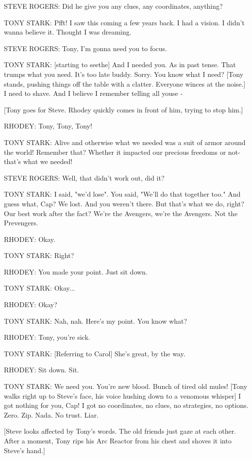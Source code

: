 STEVE ROGERS: Did he give you any clues, any coordinates, anything?

TONY STARK: Pfft! I saw this coming a few years back. I had a vision. I didn't wanna believe it. Thought I was dreaming.

STEVE ROGERS: Tony, I'm gonna need you to focus.

TONY STARK: [starting to seethe] And I needed you. As in past tense. That trumps what you need. It's too late buddy. Sorry. You know what I need? [Tony stands, pushing things off the table with a clatter. Everyone winces at the noise.] I need to shave. And I believe I remember telling all youse -

[Tony goes for Steve. Rhodey quickly comes in front of him, trying to stop him.]

RHODEY: Tony, Tony, Tony!

TONY STARK: Alive and otherwise what we needed was a suit of armor around the world! Remember that? Whether it impacted our precious freedoms or not- that's what we needed!

STEVE ROGERS: Well, that didn't work out, did it?

TONY STARK: I said, "we'd lose". You said, "We'll do that together too." And guess what, Cap? We lost. And you weren't there. But that's what we do, right? Our best work after the fact? We're the Avengers, we're the Avengers. Not the Prevengers.

RHODEY: Okay.

TONY STARK: Right?

RHODEY: You made your point. Just sit down.

TONY STARK: Okay...

RHODEY: Okay?

TONY STARK: Nah, nah. Here's my point. You know what?

RHODEY: Tony, you're sick.

TONY STARK: [Referring to Carol] She's great, by the way.

RHODEY: Sit down. Sit.

TONY STARK: We need you. You're new blood. Bunch of tired old mules! [Tony walks right up to Steve's face, his voice hushing down to a venomous whisper] I got nothing for you, Cap! I got no coordinates, no clues, no strategies, no options. Zero. Zip. Nada. No trust. Liar.

[Steve looks affected by Tony's words. The old friends just gaze at each other. After a moment, Tony rips his Arc Reactor from his chest and shoves it into Steve's hand.]

